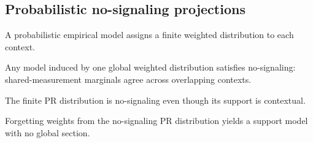 \subsection{Probabilistic no-signaling projections}

\begin{proposition}\label{thm:probabilistic-model}\leanok{}
A probabilistic empirical model assigns a finite weighted distribution to each
context.
\end{proposition}

\begin{theorem}\label{thm:global-dist-no-signaling}\leanok{}
Any model induced by one global weighted distribution satisfies no-signaling:
shared-measurement marginals agree across overlapping contexts.
\end{theorem}

\begin{theorem}\label{thm:pr-box-p-no-signaling}\leanok{}
The finite PR distribution is no-signaling even though its support is
contextual.
\end{theorem}

\begin{theorem}\label{thm:pr-support-strong-contextual}\leanok{}
Forgetting weights from the no-signaling PR distribution yields a support
model with no global section.
\end{theorem}
